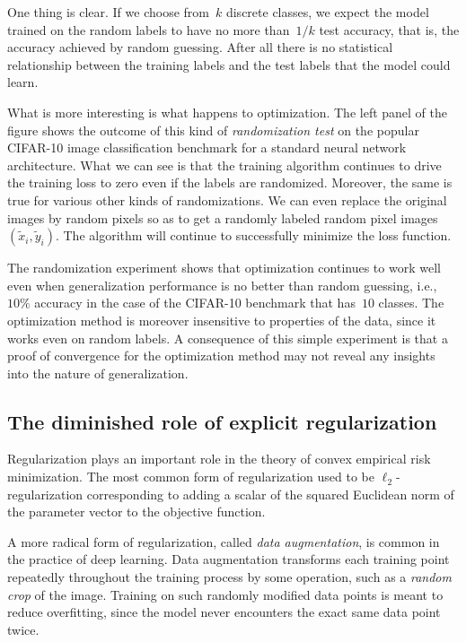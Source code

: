 \documentclass{tufte-book}
\begin{document}
One thing is clear. If we choose from~\(k\) discrete classes, we expect
the model trained on the random labels to have no more than~\(1/k\) test
accuracy, that is, the accuracy achieved by random guessing. After all
there is no statistical relationship between the training labels and the
test labels that the model could learn.

What is more interesting is what happens to optimization. The left panel
of the figure shows the outcome of this kind of \emph{randomization
test} on the popular CIFAR-10 image classification benchmark for a
standard neural network architecture. What we can see is that the
training algorithm continues to drive the training loss to zero even if
the labels are randomized. Moreover, the same is true for various other
kinds of randomizations. We can even replace the original images by
random pixels so as to get a randomly labeled random pixel images
\((\tilde x_i, \tilde y_i)\). The algorithm will continue to
successfully minimize the loss function.

The randomization experiment shows that optimization continues to work
well even when generalization performance is no better than random
guessing, i.e.,~\(10\%\) accuracy in the case of the CIFAR-10 benchmark
that has~\(10\) classes. The optimization method is moreover insensitive
to properties of the data, since it works even on random labels. A
consequence of this simple experiment is that a proof of convergence for
the optimization method may not reveal any insights into the nature of
generalization.

\hypertarget{the-diminished-role-of-explicit-regularization}{%
\subsection{The diminished role of explicit
regularization}\label{the-diminished-role-of-explicit-regularization}}


Regularization plays an important role in the theory of convex empirical
risk minimization. The most common form of regularization used to be
\(\ell_2\)-regularization corresponding to adding a scalar of the
squared Euclidean norm of the parameter vector to the objective
function.


A more radical form of regularization, called \emph{data augmentation},
is common in the practice of deep learning. Data augmentation transforms
each training point repeatedly throughout the training process by some
operation, such as a \emph{random crop} of the image. Training on such
randomly modified data points is meant to reduce overfitting, since the
model never encounters the exact same data point twice.
\end{document}
